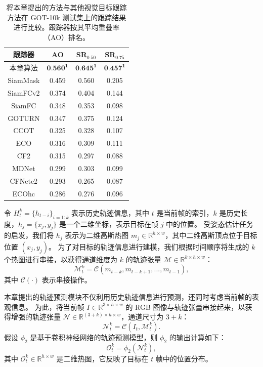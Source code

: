 \begin{table}[t]
\centering
\caption{将本章提出的方法与其他视觉目标跟踪方法在 GOT-10k 测试集上的跟踪结果进行比较。跟踪器按其平均重叠率（AO）排名。}
\begin{tabular}{cccc}
\bottomrule
跟踪器   &  AO   &  SR$_{0.50}$ & SR$_{0.75}$  \\
\hline
本章算法 &  $\textbf{0.560}^\textbf{1}$ & $\textbf{0.645}^\textbf{1}$  & $\textbf{0.457}^\textbf{1}$  \\
SiamMask \cite{Wang2018SiamMask}  &  0.459&  0.560 &0.205 \\
SiamFCv2 \cite{valmadre2017end} &  0.374&  0.404 &0.144 \\
SiamFC \cite{SiamFC} &  0.348&  0.353 &0.098 \\
GOTURN	\cite{GOTURN} &  0.347&  0.375 &0.124 \\
CCOT	 \cite{danelljan2016beyond} &  0.325&  0.328 &0.107 \\
ECO \cite{danelljan2017eco} &  0.316&  0.309 &0.111 \\
CF2	\cite{CF2} &  0.315&  0.297 &0.088 \\
MDNet \cite{MDNet} &  0.299&  0.303 &0.099 \\
CFNetc2 \cite{valmadre2017end} &  0.293&  0.265 &0.087 \\
ECOhc \cite{danelljan2017eco} &  0.286&  0.276 &0.096 \\
\bottomrule
\end{tabular}
\label{table:got}
\end{table}

令 $H_{t}^{k} = \{h_{t-i}\}_{i=1:k}$ 表示历史轨迹信息，其中 $t$ 是当前帧的索引，$k$ 是历史长度，$h_{j} = \{x_{j}, y_{j}\}$ 是一个二维坐标，表示目标在帧 $j$ 中的位置。
受姿态估计任务的启发，我们将 $h_{j}$ 表示为二维高斯热图 $m_{j} \in \mathbb R^{h \times w}$，其中二维高斯顶点位于目标位置 $(x_{j}, y_{j})$。
为了对目标的轨迹信息进行建模，我们根据时间顺序将生成的 $k$ 个热图进行串接，以获得通道维度为 $k$ 的轨迹张量 $\mathcal{M} \in \mathbb{R}^{k \times h \times w}$：
\begin{equation}
    \mathcal{M}_{t}^{k} = \mathcal{C}(m_{t-k}, m_{t-k+1}, ..., m_{t-1}),
\end{equation}
其中 $\mathcal{C}(\cdot)$ 表示串接操作。

本章提出的轨迹预测模块不仅利用历史轨迹信息进行预测，还同时考虑当前帧的表观信息。
为此，将当前帧 $I \in \mathbb{R}^{3 \times h \times w}$ 的 RGB 图像与轨迹张量串接起来，以获得增强的轨迹张量 $\mathcal{N} \in \mathbb{R}^{(3+k) \times h \times w}$，通道尺寸为 $3+k$：
\begin{equation}
    \mathcal{N}_{t}^{k} = \mathcal{C}(I_{t}, \mathcal{M}_{t}^{k}).
\end{equation}
假设 $\phi_{2}$ 是基于卷积神经网络的轨迹预测模型，则 $\phi_{2}$ 的输出计算如下：
\begin{equation}
    \mathcal{O}_{t}^{k} = \phi_{2}(\mathcal{N}_{t}^{k}),
\end{equation}
其中 $\mathcal{O}_{t}^{k} \in \mathbb{R}^{h \times w}$ 是二维热图，它反映了目标在 $t$ 帧中的位置分布。

